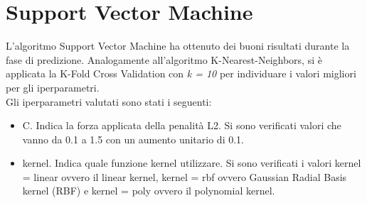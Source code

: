 \section{Support Vector Machine}
L'algoritmo Support Vector Machine ha ottenuto dei buoni risultati durante la fase di predizione. Analogamente all'algoritmo K-Nearest-Neighbors, si è applicata la K-Fold Cross Validation con \emph{k = 10} per individuare i valori migliori per gli iperparametri.\\
Gli iperparametri valutati sono stati i seguenti:
\begin{itemize}
	\item \textsf{C}. Indica la forza applicata della penalità L2. Si sono verificati valori che vanno da 0.1 a 1.5 con un aumento unitario di 0.1.
	\item \textsf{kernel}. Indica quale funzione kernel utilizzare. Si sono verificati i valori kernel = linear ovvero il linear kernel, kernel = rbf ovvero Gaussian Radial Basis kernel (RBF) e kernel = poly ovvero il polynomial kernel.
\end{itemize}

